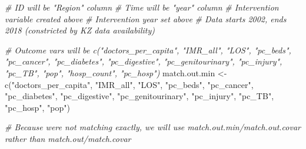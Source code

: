 \documentclass[
]{article}
\newenvironment{Shaded}{\begin{snugshade}}{\end{snugshade}}
\newcommand{\CommentTok}[1]{\textcolor[rgb]{0.56,0.35,0.01}{\textit{#1}}}
\newcommand{\FunctionTok}[1]{\textcolor[rgb]{0.00,0.00,0.00}{#1}}
\newcommand{\NormalTok}[1]{#1}
\newcommand{\OtherTok}[1]{\textcolor[rgb]{0.56,0.35,0.01}{#1}}
\newcommand{\StringTok}[1]{\textcolor[rgb]{0.31,0.60,0.02}{#1}}
\begin{document}
\begin{Shaded}
\begin{Highlighting}[]
\CommentTok{\# ID will be "Region" column}
\CommentTok{\# Time will be "year" column}
\CommentTok{\# Intervention variable created above}
\CommentTok{\# Intervention year set above}
\CommentTok{\# Data starts 2002, ends 2018 (constricted by KZ data availability)}

\CommentTok{\# Outcome vars will be c("doctors\_per\_capita", "IMR\_all", "LOS", "pc\_beds", "pc\_cancer", "pc\_diabetes", "pc\_digestive", "pc\_genitourinary", "pc\_injury", "pc\_TB", "pop", "hosp\_count", "pc\_hosp")}
\NormalTok{match.out.min }\OtherTok{\textless{}{-}} \FunctionTok{c}\NormalTok{(}\StringTok{"doctors\_per\_capita"}\NormalTok{, }\StringTok{"IMR\_all"}\NormalTok{, }\StringTok{"LOS"}\NormalTok{, }\StringTok{"pc\_beds"}\NormalTok{, }
                   \StringTok{"pc\_cancer"}\NormalTok{, }\StringTok{"pc\_diabetes"}\NormalTok{, }\StringTok{"pc\_digestive"}\NormalTok{, }
                   \StringTok{"pc\_genitourinary"}\NormalTok{, }\StringTok{"pc\_injury"}\NormalTok{, }\StringTok{"pc\_TB"}\NormalTok{, }\StringTok{"pc\_hosp"}\NormalTok{, }\StringTok{"pop"}\NormalTok{)}

\CommentTok{\# Because we\textquotesingle{}re not matching exactly, we will use match.out.min/match.out.covar rather than match.out/match.covar}


\end{Highlighting}
\end{Shaded}
\end{document}
